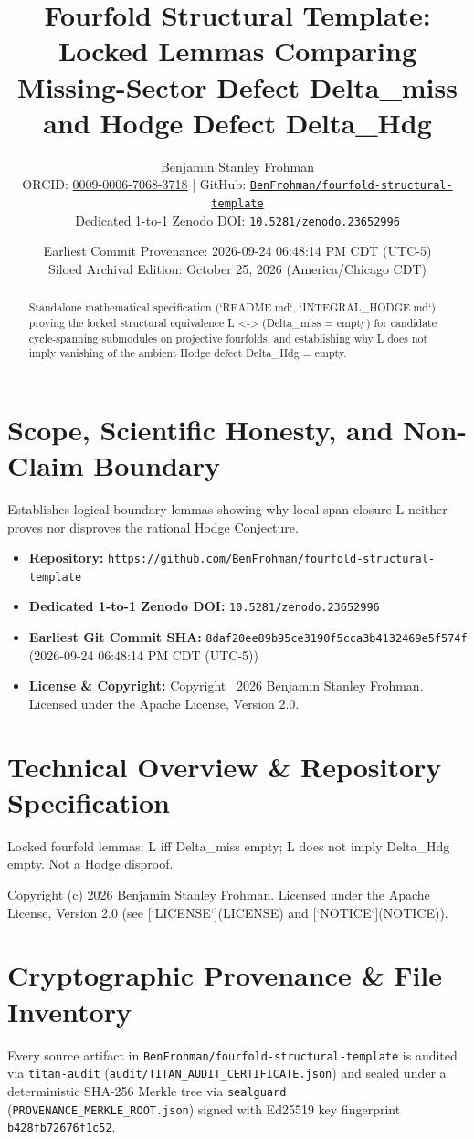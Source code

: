 \documentclass[11pt,a4paper]{article}
\title{\textbf{Fourfold Structural Template: Locked Lemmas Comparing Missing-Sector Defect Delta\_miss and Hodge Defect Delta\_Hdg}}
\author{Benjamin Stanley Frohman\\
\small ORCID: \href{https://orcid.org/0009-0006-7068-3718}{0009-0006-7068-3718} \quad|\quad
GitHub: \href{https://github.com/BenFrohman/fourfold-structural-template}{\texttt{BenFrohman/fourfold-structural-template}}\\
\small Dedicated 1-to-1 Zenodo DOI: \href{https://doi.org/10.5281/zenodo.23652996}{\texttt{10.5281/zenodo.23652996}}}
\date{Earliest Commit Provenance: 2026-09-24 06:48:14 PM CDT (UTC-5)\\
Siloed Archival Edition: October 25, 2026 (America/Chicago CDT)}
\begin{document}
\maketitle

\begin{abstract}
Standalone mathematical specification (`README.md`, `INTEGRAL\_HODGE.md`) proving the locked structural equivalence L <-> (Delta\_miss = empty) for candidate cycle-spanning submodules on projective fourfolds, and establishing why L does not imply vanishing of the ambient Hodge defect Delta\_Hdg = empty.
\end{abstract}

\section{Scope, Scientific Honesty, and Non-Claim Boundary}
Establishes logical boundary lemmas showing why local span closure L neither proves nor disproves the rational Hodge Conjecture.

\begin{itemize}
  \item \textbf{Repository:} \texttt{https://github.com/BenFrohman/fourfold-structural-template}
  \item \textbf{Dedicated 1-to-1 Zenodo DOI:} \texttt{10.5281/zenodo.23652996}
  \item \textbf{Earliest Git Commit SHA:} \texttt{8daf20ee89b95ce3190f5cca3b4132469e5f574f} (2026-09-24 06:48:14 PM CDT (UTC-5))
  \item \textbf{License \& Copyright:} Copyright \textcopyright\ 2026 Benjamin Stanley Frohman. Licensed under the Apache License, Version 2.0.
\end{itemize}

\section{Technical Overview \& Repository Specification}
Locked fourfold lemmas: L iff Delta\_miss empty; L does not imply Delta\_Hdg empty. Not a Hodge disproof.

Copyright (c) 2026 Benjamin Stanley Frohman. Licensed under the Apache License, Version 2.0 (see [`LICENSE`](LICENSE) and [`NOTICE`](NOTICE)).

\section{Cryptographic Provenance \& File Inventory}
Every source artifact in \texttt{BenFrohman/fourfold-structural-template} is audited via \texttt{titan-audit}
(\texttt{audit/TITAN\_AUDIT\_CERTIFICATE.json}) and sealed under a deterministic SHA-256 Merkle tree via
\texttt{sealguard} (\texttt{PROVENANCE\_MERKLE\_ROOT.json}) signed with Ed25519 key fingerprint
\texttt{b428fb72676f1c52}.
\end{document}
